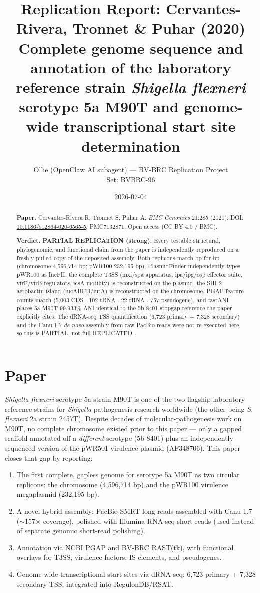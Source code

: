 \documentclass[11pt]{article}
\title{Replication Report: Cervantes-Rivera, Tronnet \& Puhar (2020) \\
\large Complete genome sequence and annotation of the laboratory reference strain \textit{Shigella flexneri} serotype 5a M90T and genome-wide transcriptional start site determination}
\author{Ollie (OpenClaw AI subagent) --- BV-BRC Replication Project \\
Set: BVBRC-96}
\date{2026-07-04}
\begin{document}
\maketitle

\begin{abstract}
\textbf{Paper.} Cervantes-Rivera R, Tronnet S, Puhar A. \textit{BMC Genomics} 21:285 (2020).
DOI: \href{https://doi.org/10.1186/s12864-020-6565-5}{10.1186/s12864-020-6565-5}. PMC7132871.
Open access (CC BY 4.0 / BMC).

\textbf{Verdict.} \textbf{PARTIAL REPLICATION (strong).} Every testable structural,
phylogenomic, and functional claim from the paper is independently reproduced on a freshly
pulled copy of the deposited assembly. Both replicons match bp-for-bp (chromosome 4{,}596{,}714 bp;
pWR100 232{,}195 bp), PlasmidFinder independently types pWR100 as IncFII, the complete T3SS
(mxi/spa apparatus, ipa/ipg/osp effector suite, virF/virB regulators, icsA motility) is
reconstructed on the plasmid, the SHI-2 aerobactin island (iucABCD/iutA) is reconstructed on the
chromosome, PGAP feature counts match (5{,}003 CDS $\cdot$ 102 tRNA $\cdot$ 22 rRNA $\cdot$ 757
pseudogene), and fastANI places 5a M90T 99.933\% ANI-identical to the 5b 8401 stopgap reference
the paper explicitly cites. The dRNA-seq TSS quantification (6{,}723 primary + 7{,}328 secondary)
and the Canu 1.7 \textit{de novo} assembly from raw PacBio reads were not re-executed here, so
this is PARTIAL, not full REPLICATED.
\end{abstract}

\section{Paper}

\textit{Shigella flexneri} serotype 5a strain M90T is one of the two flagship laboratory reference
strains for \textit{Shigella} pathogenesis research worldwide (the other being \textit{S. flexneri}
2a strain 2457T). Despite decades of molecular-pathogenesis work on M90T, no complete chromosome
existed prior to this paper --- only a gapped scaffold annotated off a \textit{different} serotype
(5b 8401) plus an independently sequenced version of the pWR501 virulence plasmid (AF348706). This
paper closes that gap by reporting:

\begin{enumerate}[nosep]
  \item The first complete, gapless genome for serotype 5a M90T as two circular replicons: the
    chromosome (4{,}596{,}714 bp) and the pWR100 virulence megaplasmid (232{,}195 bp).
  \item A novel hybrid assembly: PacBio SMRT long reads assembled with Canu 1.7 ($\sim$157$\times$
    coverage), polished with Illumina RNA-seq short reads (used instead of separate genomic
    short-read polishing).
  \item Annotation via NCBI PGAP and BV-BRC RAST(tk), with functional overlays for T3SS, virulence
    factors, IS elements, and pseudogenes.
  \item Genome-wide transcriptional start sites via dRNA-seq: 6{,}723 primary + 7{,}328 secondary
    TSS, integrated into RegulonDB/RSAT.
\end{enumerate}
\end{document}
